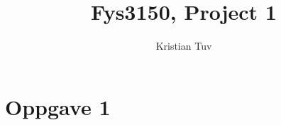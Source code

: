 \documentclass[a4paper, norsk, 12pt]{article}
\begin{document}
\author{Kristian Tuv}
\title{Fys3150, Project 1}
\maketitle

\section*{Oppgave 1}
\end{document}
